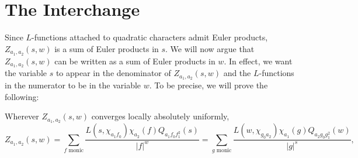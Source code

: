 \documentclass[12pt,reqno,oneside]{amsart}
\begin{document}
\section{The Interchange}
    Since $L$-functions attached to quadratic characters admit Euler products, $Z_{a_{1},a_{2}}(s,w)$ is a sum of Euler products in $s$. We will now argue that $Z_{a_{1},a_{2}}(s,w)$ can be written as a sum of Euler products in $w$. In effect, we want the variable $s$ to appear in the denominator of $Z_{a_{1},a_{2}}(s,w)$ and the $L$-functions in the numerator to be in the variable $w$. To be precise, we will prove the following:

    \begin{theorem}
        Wherever $Z_{a_{1},a_{2}}(s,w)$ converges locally absolutely uniformly,
        \[
            Z_{a_{1},a_{2}}(s,w) = \sum_{\text{$f$ monic}}\frac{L(s,\chi_{a_{1}f_{0}})\chi_{a_{2}}(f)Q_{a_{1}f_{0}f_{1}^{2}}(s)}{|f|^{w}} = \sum_{\text{$g$ monic}}\frac{L(w,\chi_{g_{0}a_{2}})\chi_{a_{1}}(g)Q_{a_{2}g_{0}g_{1}^{2}}(w)}{|g|^{s}},
        \]
    \end{theorem}
\end{document}
